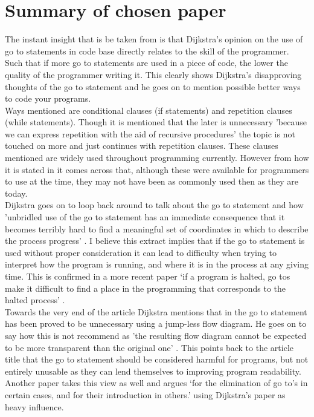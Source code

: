 \documentclass{scrartcl}
\begin{document}
\section{Summary of chosen paper}
The instant insight that is be taken from \cite{dijkstra2002go} is that Dijkstra's opinion on the use of go to statements in code base directly relates to the skill of the programmer. Such that if more go to statements are used in a piece of code, the lower the quality of the programmer writing it. This clearly shows Dijkstra's disapproving thoughts of the go to statement and he goes on to mention possible better ways to code your programs.\\ Ways mentioned are conditional clauses (if statements) and repetition clauses (while statements). Though it is mentioned that the later is unnecessary 'because we can express repetition with the aid of recursive procedures' \cite[p.147]{dijkstra2002go} the topic is not touched on more and just continues with repetition clauses. These clauses mentioned are widely used throughout programming currently. However from how it is stated in \cite{dijkstra2002go} it comes across that, although these were available for programmers to use at the time, they may not have been as commonly used then as they are today.\\ Dijkstra goes on to loop back around to talk about the go to statement and how 'unbridled use of the go to statement has an immediate consequence that it becomes terribly hard to find a meaningful set of coordinates in which to describe the process progress' \cite[p.147]{dijkstra2002go}. I believe this extract implies that if the go to statement is used without proper consideration it can lead to difficulty when trying to interpret how the program is running, and where it is in the process at any giving time. This is confirmed in a more recent paper `if a program is halted, go tos make it difficult to find a place in the programming that corresponds to the halted process' \cite[p.37]{chun2005software}.\\ Towards the very end of the article Dijkstra mentions that in \cite{bohm1966flow} the go to statement has been proved to be unnecessary using a jump-less flow diagram. He goes on to say how this is not recommend as 'the resulting flow diagram cannot be expected to be more transparent than the original one' \cite[p.148]{dijkstra2002go}. This points back to the article title that the go to statement should be considered harmful for programs, but not entirely unusable as they can lend themselves to improving program readability. Another paper takes this view as well and argues `for the elimination of go to's
in certain cases, and for their introduction in others.' \cite[p.262]{knuth1974structured} using Dijkstra's paper as heavy influence.
\end{document}

